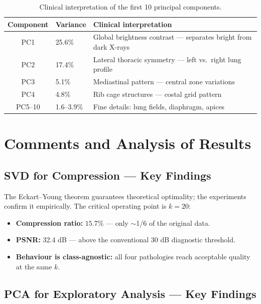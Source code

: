 \documentclass[11pt,a4paper]{article}
\theoremstyle{definition}
\begin{document}
\begin{table}[H]
\centering
\begin{tabular}{clp{7cm}}
\toprule
\textbf{Component} & \textbf{Variance} & \textbf{Clinical interpretation} \\
\midrule
PC1  & 25.6\% & Global brightness contrast --- separates bright from dark X-rays \\
PC2  & 17.4\% & Lateral thoracic symmetry --- left vs.\ right lung profile \\
PC3  & 5.1\%  & Mediastinal pattern --- central zone variations \\
PC4  & 4.8\%  & Rib cage structures --- costal grid pattern \\
PC5--10 & 1.6--3.9\% & Fine details: lung fields, diaphragm, apices \\
\bottomrule
\end{tabular}
\caption{Clinical interpretation of the first 10 principal components.}
\end{table}


\section{Comments and Analysis of Results}

\subsection{SVD for Compression --- Key Findings}

The Eckart--Young theorem guarantees theoretical optimality; the experiments
confirm it empirically. The critical operating point is $k = 20$:
\begin{itemize}[nosep]
  \item \textbf{Compression ratio:} $15.7\%$ --- only $\sim$1/6 of the original data.
  \item \textbf{PSNR:} 32.4 dB --- above the conventional 30 dB diagnostic threshold.
  \item \textbf{Behaviour is class-agnostic:} all four pathologies reach acceptable quality at the same $k$.
\end{itemize}

\subsection{PCA for Exploratory Analysis --- Key Findings}
\end{document}
